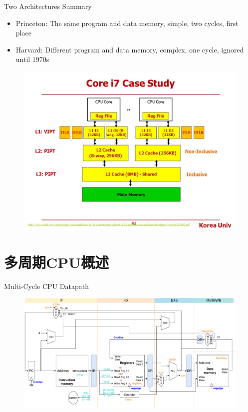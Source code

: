 \documentclass[UTF8]{ctexbeamer}
\begin{document}
\begin{frame}{Two Architectures Summary}
\begin{itemize}
	\item Princeton: The same program and data memory, simple, two cycles, first place
	\item Harvard: Different program and data memory, complex, one cycle, ignored until 1970s
\end{itemize}
\begin{figure}
\centering
\includegraphics[width=0.6\linewidth]{fig/Lecture2/Core-i7-cache.jpg}
\end{figure}
\end{frame}

\section{多周期CPU概述}
\begin{frame}
\sectionpage
\end{frame}

\begin{frame}{Multi-Cycle CPU Datapath}
\begin{figure}
\centering
\includegraphics[width=\linewidth]{fig/Lecture2/Datapath-Multi.pdf}
\end{figure}
\end{frame}
\end{document}

